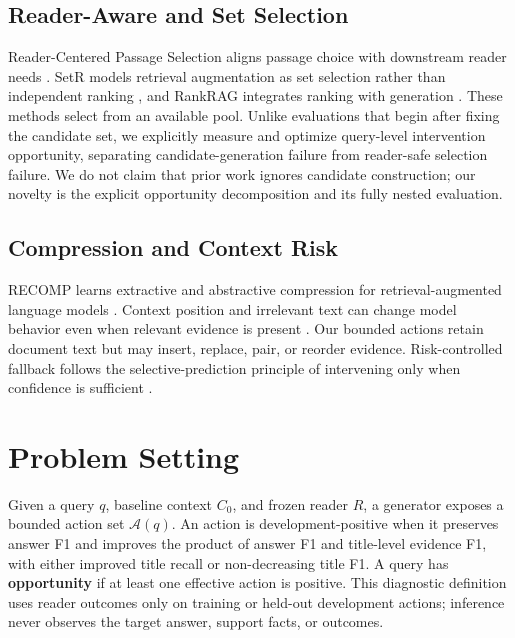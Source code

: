 \subsection{Reader-Aware and Set Selection}

Reader-Centered Passage Selection aligns passage choice with downstream reader needs \citep{xin-etal-2025-rcps}. SetR models retrieval augmentation as set selection rather than independent ranking \citep{lee-etal-2025-setr}, and RankRAG integrates ranking with generation \citep{yu-etal-2024-rankrag}. These methods select from an available pool. Unlike evaluations that begin after fixing the candidate set, we explicitly measure and optimize query-level intervention opportunity, separating candidate-generation failure from reader-safe selection failure. We do not claim that prior work ignores candidate construction; our novelty is the explicit opportunity decomposition and its fully nested evaluation.

\subsection{Compression and Context Risk}

RECOMP learns extractive and abstractive compression for retrieval-augmented language models \citep{xu-etal-2024-recomp}. Context position and irrelevant text can change model behavior even when relevant evidence is present \citep{liu-etal-2024-lost,shi-etal-2023-distracted}. Our bounded actions retain document text but may insert, replace, pair, or reorder evidence. Risk-controlled fallback follows the selective-prediction principle of intervening only when confidence is sufficient \citep{geifman-elyaniv-2019-selectivenet}.

\section{Problem Setting}

Given a query $q$, baseline context $C_0$, and frozen reader $R$, a generator exposes a bounded action set $\mathcal{A}(q)$. An action is development-positive when it preserves answer F1 and improves the product of answer F1 and title-level evidence F1, with either improved title recall or non-decreasing title F1. A query has \textbf{opportunity} if at least one effective action is positive. This diagnostic definition uses reader outcomes only on training or held-out development actions; inference never observes the target answer, support facts, or outcomes.

